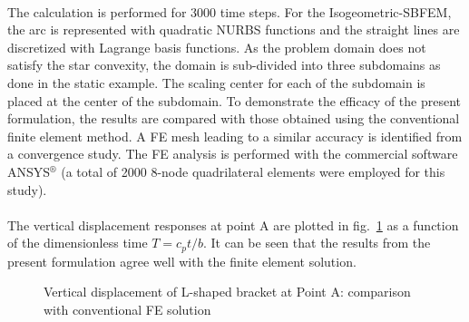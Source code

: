 \paragraph{}
The calculation is performed for 3000 time steps.
For the Isogeometric-SBFEM, the arc is represented with quadratic NURBS functions and the straight lines are discretized with
    Lagrange basis functions.
As the problem domain does not satisfy the star convexity, the domain is sub-divided into three subdomains as done in the static example.
The scaling center for each of the subdomain is placed at the center of the subdomain.
To demonstrate the efficacy of the present formulation, the results are compared with those obtained using the conventional
    finite element method.
A FE mesh leading to a similar accuracy is identified from a convergence study.
The FE analysis is performed with the commercial software ANSYS$^\circledR$ (a total of 2000 8-node quadrilateral elements
    were employed for this study).

\paragraph{}
The vertical displacement responses at point A are plotted in fig.~\ref{iso_fig:l_uy_dynamic_at_A} as a function of the dimensionless
    time $T = c_pt/b$.
It can be seen that the results from the present formulation agree well with the finite element solution.
    \begin{figure}
        \centering
    \caption{Vertical displacement of L-shaped bracket at Point A: comparison with conventional FE solution}
    \label{iso_fig:l_uy_dynamic_at_A}
    \end{figure}

\pagebreak